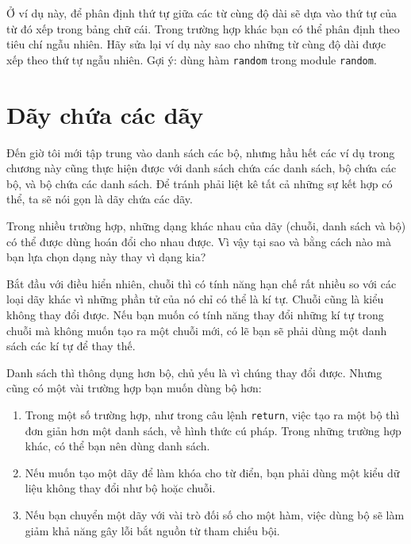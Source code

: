\documentclass[11pt]{book}
\begin{document}
\begin{ex}
Ở ví dụ này, để phân định thứ tự giữa các từ cùng độ dài sẽ
dựa vào thứ tự của từ đó xếp trong bảng chữ cái. Trong trường hợp
khác bạn có thể phân định theo tiêu chí ngẫu nhiên. Hãy sửa lại
ví dụ này sao cho những từ cùng độ dài được xếp theo thứ tự
ngẫu nhiên. Gợi ý: dùng hàm {\tt random} trong module
{\tt random}.


\end{ex}


\section{Dãy chứa các dãy}

Đến giờ tôi mới tập trung vào danh sách các bộ, nhưng hầu hết các ví dụ
trong chương này cũng thực hiện được với danh sách chứa các danh sách, bộ chứa
các bộ, và bộ chứa các danh sách. Để tránh phải liệt kê tất cả những sự kết hợp
có thể, ta sẽ nói gọn là dãy chứa các dãy.

Trong nhiều trường hợp, những dạng khác nhau của dãy (chuỗi, danh sách và
bộ) có thể được dùng hoán đổi cho nhau được. Vì vậy tại sao và bằng cách nào
mà bạn lựa chọn dạng này thay vì dạng kia?



Bắt đầu với điều hiển nhiên, chuỗi thì có tính năng hạn chế rất nhiều
so với các loại dãy khác vì những phần tử của nó chỉ có thể là kí tự.
Chuỗi cũng là kiểu không thay đổi được. Nếu bạn muốn có tính năng thay đổi
những kí tự trong chuỗi mà không muốn tạo ra một chuỗi mới, có lẽ bạn sẽ
phải dùng một danh sách các kí tự để thay thế.

Danh sách thì thông dụng hơn bộ, chủ yếu là vì chúng thay đổi được.
Nhưng cũng có một vài trường hợp bạn muốn dùng bộ hơn:

\begin{enumerate}

\item Trong một số trường hợp, như trong câu lệnh {\tt return}, việc tạo ra một bộ 
thì đơn giản hơn một danh sách, về hình thức cú pháp. Trong những
trường hợp khác, có thể bạn nên dùng danh sách.

\item Nếu muốn tạo một dãy để làm khóa cho từ điển, bạn phải dùng
một kiểu dữ liệu không thay đổi như bộ hoặc chuỗi.

\item Nếu bạn chuyển một dãy với vài trò đối số cho một hàm, 
việc dùng bộ sẽ làm giảm khả năng gây lỗi bắt nguồn từ tham chiếu bội.

\end{enumerate}
\end{document}
